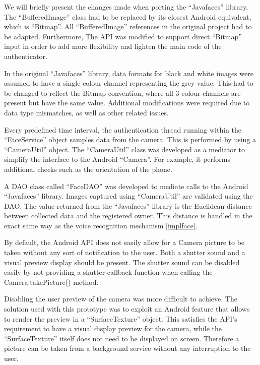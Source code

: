 We will briefly present the changes made when porting the ``Javafaces'' library. The ``BufferedImage'' class had to be replaced by its closest Android equivalent, which is ``Bitmap''. All ``BufferedImage'' references in the original project had to be adapted. Furthermore, The API was modified to support direct ``Bitmap'' input in order to add more flexibility and lighten the main code of the authenticator. 

In the original ``Javafaces'' library, data formats for black and white images were assumed to have a single colour channel representing the grey value. This had to be changed to reflect the Bitmap convention, where all 3 colour channels are present but have the same value. Additional modifications were required due to data type mismatches, as well as other related issues.

Every predefined time interval, the authentication thread running within the ``FaceService'' object samples data from the camera. This is performed by using a ``CameraUtil'' object. The ``CameraUtil'' class was developed as a mediator to simplify the interface to the Android ``Camera''. For example, it performs additional checks such as the orientation of the phone. 

A DAO class called ``FaceDAO'' was developed to mediate calls to the Android ``Javafaces'' library. Images captured using ``CameraUtil'' are validated using the DAO. The value returned from the ``Javafaces'' library is the Euclidean distance between collected data and the registered owner. This distance is handled in the exact same way as the voice recognition mechanism \ref{implface}.

By default, the Android API does not easily allow for a Camera picture to be taken without any sort of notification to the user. Both a shutter sound and a visual preview display should be present. The shutter sound can be disabled easily by not providing a shutter callback function when calling the Camera.takePicture() method. 

Disabling the user preview of the camera was more difficult to achieve. The solution used with this prototype was to exploit an Android feature that allows to render the preview in a ``SurfaceTexture'' object. This satisfies the API's requirement to have a visual display preview for the camera, while the ``SurfaceTexture'' itself does not need to be displayed on screen. Therefore a picture can be taken from a background service without any interruption to the user.

